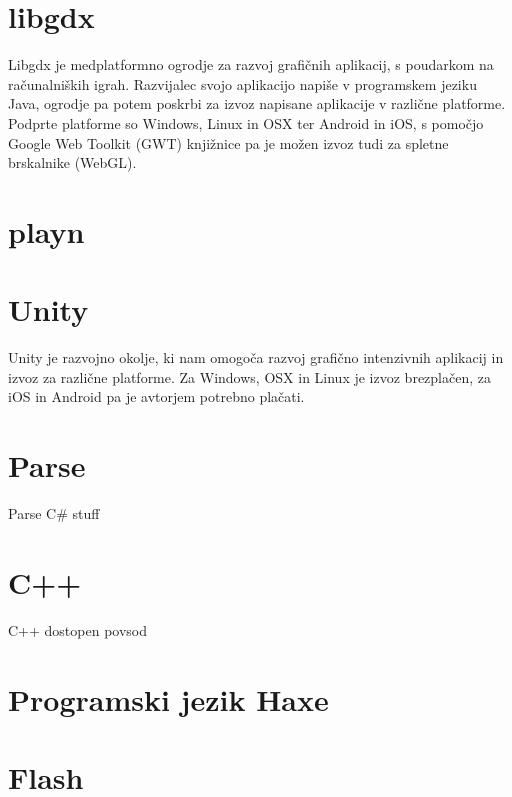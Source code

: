 \section{libgdx\cite{libgdx}}

Libgdx je medplatformno ogrodje za razvoj grafičnih aplikacij, s poudarkom na računalniških igrah. Razvijalec svojo aplikacijo napiše v programskem jeziku Java, ogrodje pa potem poskrbi za izvoz napisane aplikacije v različne platforme. Podprte platforme so Windows, Linux in OSX ter Android in iOS, s pomočjo Google Web Toolkit (GWT) knjižnice pa je možen izvoz tudi za spletne brskalnike (WebGL).

\section{playn\cite{playn}}


\section{Unity\cite{unity}}

Unity je razvojno okolje, ki nam omogoča razvoj grafično intenzivnih aplikacij in izvoz za različne platforme. Za Windows, OSX in Linux je izvoz brezplačen, za iOS in Android pa je avtorjem potrebno plačati.

\section{Parse\cite{parse}}

Parse C\# stuff

\section{C++}

C++ dostopen povsod

\section{Programski jezik Haxe}

\section{Flash}